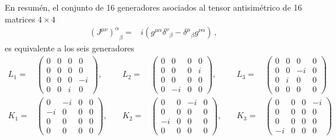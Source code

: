 \begin{frame}
En resumén, el conjunto de 16 generadores asociados al tensor antisimétrico de 16 matrices $4\times4$
\begin{align}
  {\left(J^{\mu\nu}\right)^{\alpha}}_{\beta}  =  &i\left(g^{\mu\alpha}{\delta^\nu}_\beta-{\delta^\mu}_\beta g^{\nu\alpha}\right)\,,
\end{align}
es equivalente a los seis generadores
\begin{align}
  L_{1}=&  
  \begin{pmatrix}
0 & 0 & 0 & 0 \\
0 & 0 & 0 & 0 \\
0 & 0 & 0 & -i \\
0 & 0 & i & 0
  \end{pmatrix}, \quad &L_{2}=&
  \begin{pmatrix}
0 & 0 & 0 & 0 \\
0 & 0 & 0 & i \\
0 & 0 & 0 & 0 \\
0 & -i & 0 & 0
  \end{pmatrix},\quad& L_{3}=&
  \begin{pmatrix}
0 & 0 & 0 & 0 \\
0 & 0 & -i & 0 \\
0 & i & 0 & 0 \\
0 & 0 & 0 & 0
  \end{pmatrix} \nonumber\\
K_{1}=&\begin{pmatrix}
0 & -i & 0 & 0 \\
-i & 0 & 0 & 0 \\
0 & 0 & 0 & 0 \\
0 & 0 & 0 & 0
\end{pmatrix}, \quad &K_{2}=&\begin{pmatrix}
0 & 0 & -i & 0 \\
0 & 0 & 0 & 0 \\
-i & 0 & 0 & 0 \\
0 & 0 & 0 & 0
\end{pmatrix},\quad &K_{3}=&\begin{pmatrix}
0 & 0 & 0 & -i \\
0 & 0 & 0 & 0 \\
0 & 0 & 0 & 0 \\
-i & 0 & 0 & 0
\end{pmatrix}
\end{align}
\end{frame}


